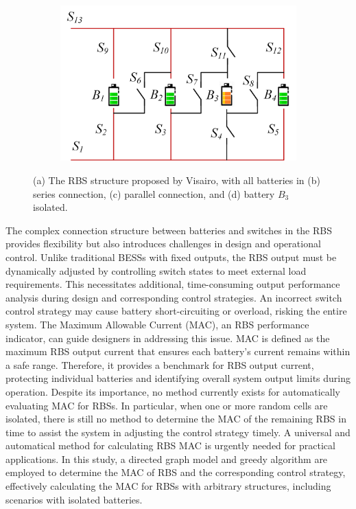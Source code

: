 \documentclass{article}
\begin{document}
\begin{figure}[htbp]
\begin{subfigure}[b]{0.45\textwidth}
        \caption{}
        \label{fig:stru-Visairo-parallel}
    \end{subfigure}
    \hspace{0.05\textwidth}
    \begin{subfigure}[b]{0.45\textwidth}
        \includegraphics[width=\textwidth]{stru-V-isolate}
        \caption{}
        \label{fig:stru-Visairo-isolate}
    \end{subfigure}
    \caption{
        (a) The RBS structure proposed by Visairo\cite{visairoReconfigurableBatteryPack2008}, with
        all batteries in (b) series connection, (c) parallel connection, and
        (d) battery $B_3$ isolated.
        }
    \label{fig:arch}
\end{figure}

The complex connection structure between batteries and switches in the RBS provides flexibility but also introduces challenges in design and operational control. 
Unlike traditional BESSs with fixed outputs, the RBS output must be dynamically adjusted by controlling switch states to meet external load requirements. 
This necessitates additional, time-consuming output performance analysis during design and corresponding control strategies. 
An incorrect switch control strategy may cause battery short-circuiting or overload, risking the entire system. 
The Maximum Allowable Current (MAC), an RBS performance indicator, can guide designers in addressing this issue. 
MAC is defined as the maximum RBS output current that ensures each battery's current remains within a safe range.
Therefore, it provides a benchmark for RBS output current, protecting individual batteries and identifying overall system output limits during operation. 
Despite its importance, no method currently exists for automatically evaluating MAC for RBSs.
In particular, when one or more random cells are isolated, there is still no method to determine the MAC of the remaining RBS in time to assist the system in adjusting the control strategy timely. 
A universal and automatical method for calculating RBS MAC is urgently needed for practical applications. 
In this study, a directed graph model and greedy algorithm are employed to determine the MAC of RBS and the corresponding control strategy, effectively calculating the MAC for RBSs with arbitrary structures, including scenarios with isolated batteries.
\end{document}
